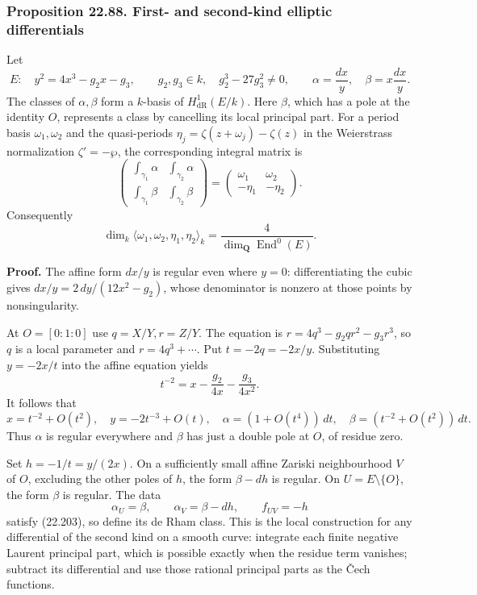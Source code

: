 \documentclass[
  11pt,
  a4paper,
]{article}
\begin{document}
\subsubsection{Proposition 22.88. First- and second-kind elliptic
differentials}\label{proposition-22.88.-first--and-second-kind-elliptic-differentials}

Let \[
 E:\quad y^2=4x^3-g_2x-g_3,\qquad
 g_2,g_3\in k,\quad g_2^3-27g_3^2\ne0,
 \qquad
 \alpha=\frac{dx}{y},\quad \beta=x\frac{dx}{y}.
 \tag{22.213}
\] The classes of \(\alpha,\beta\) form a \(k\)-basis of
\(H^1_{\mathrm{dR}}(E/k)\). Here \(\beta\), which has a pole at the
identity \(O\), represents a class by cancelling its local principal
part. For a period basis \(\omega_1,\omega_2\) and the quasi-periods
\(\eta_j=\zeta(z+\omega_j)-\zeta(z)\) in the Weierstrass normalization
\(\zeta'=-\wp\), the corresponding integral matrix is \[
 \begin{pmatrix}
 \int_{\gamma_1}\alpha&\int_{\gamma_2}\alpha\\
 \int_{\gamma_1}\beta&\int_{\gamma_2}\beta
 \end{pmatrix}
 =
 \begin{pmatrix}\omega_1&\omega_2\\-\eta_1&-\eta_2\end{pmatrix}.
 \tag{22.214}
\] Consequently \[
 \dim_k\langle\omega_1,\omega_2,\eta_1,\eta_2\rangle_k
 =\frac4{\dim_{\mathbf Q}\operatorname{End}^0(E)}.
 \tag{22.215}
\]

\textbf{Proof.} The affine form \(dx/y\) is regular even where \(y=0\):
differentiating the cubic gives \(dx/y=2\,dy/(12x^2-g_2)\), whose
denominator is nonzero at those points by nonsingularity.

At \(O=[0:1:0]\) use \(q=X/Y,r=Z/Y\). The equation is
\(r=4q^3-g_2qr^2-g_3r^3\), so \(q\) is a local parameter and
\(r=4q^3+\cdots\). Put \(t=-2q=-2x/y\). Substituting \(y=-2x/t\) into
the affine equation yields \[
 t^{-2}=x-\frac{g_2}{4x}-\frac{g_3}{4x^2}.
\] It follows that \[
 x=t^{-2}+O(t^2),\quad y=-2t^{-3}+O(t),\quad
 \alpha=(1+O(t^4))\,dt,\quad
 \beta=(t^{-2}+O(t^2))\,dt.
 \tag{22.216}
\] Thus \(\alpha\) is regular everywhere and \(\beta\) has just a double
pole at \(O\), of residue zero.

Set \(h=-1/t=y/(2x)\). On a sufficiently small affine Zariski
neighbourhood \(V\) of \(O\), excluding the other poles of \(h\), the
form \(\beta-dh\) is regular. On \(U=E\setminus\{O\}\), the form
\(\beta\) is regular. The data \[
 \alpha_U=\beta,\qquad \alpha_V=\beta-dh,\qquad f_{UV}=-h
 \tag{22.217}
\] satisfy (22.203), so define its de Rham class. This is the local
construction for any differential of the second kind on a smooth curve:
integrate each finite negative Laurent principal part, which is possible
exactly when the residue term vanishes; subtract its differential and
use those rational principal parts as the Čech functions.
\end{document}
